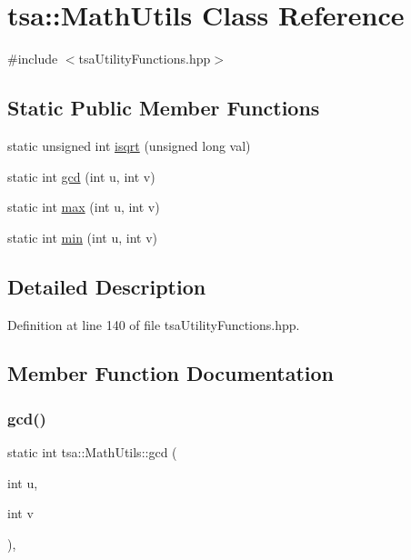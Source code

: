 \hypertarget{classtsa_1_1_math_utils}{}\section{tsa\+:\+:Math\+Utils Class Reference}
\label{classtsa_1_1_math_utils}


{\ttfamily \#include $<$tsa\+Utility\+Functions.\+hpp$>$}

\subsection*{Static Public Member Functions}
\begin{DoxyCompactItemize}
\item 
static unsigned int \hyperlink{classtsa_1_1_math_utils_a4d4f3e95ae31cf490baec26aa6babba6}{isqrt} (unsigned long val)
\item 
static int \hyperlink{classtsa_1_1_math_utils_a4edc4a9fbd224706b312200fadfd6e6e}{gcd} (int u, int v)
\item 
static int \hyperlink{classtsa_1_1_math_utils_a52fe9c7e80f1facb7dd118491786ad27}{max} (int u, int v)
\item 
static int \hyperlink{classtsa_1_1_math_utils_a00386ddcb986eea58d68e5fb2e4bd9f1}{min} (int u, int v)
\end{DoxyCompactItemize}


\subsection{Detailed Description}


Definition at line 140 of file tsa\+Utility\+Functions.\+hpp.



\subsection{Member Function Documentation}
\mbox{\label{classtsa_1_1_math_utils_a4edc4a9fbd224706b312200fadfd6e6e}} 
\subsubsection{\texorpdfstring{gcd()}{gcd()}}
{\footnotesize\ttfamily static int tsa\+::\+Math\+Utils\+::gcd (\begin{DoxyParamCaption}\item[{int}]{u,  }\item[{int}]{v }\end{DoxyParamCaption})\hspace{0.3cm}{\ttfamily [inline]}, {\ttfamily [static]}}

